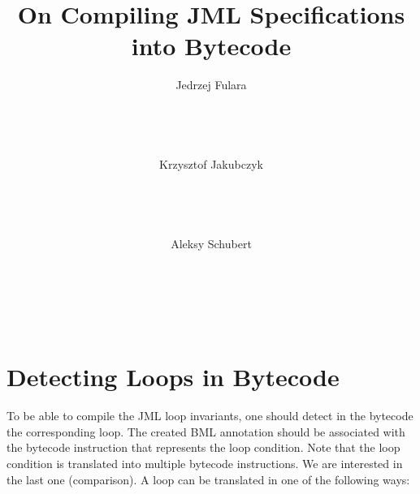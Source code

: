\documentclass{acm_proc_article-sp}
\author{
\alignauthor
Jedrzej Fulara\\
\affaddr{Institute of Informatics}\\
\affaddr{University of Warsaw}\\
\affaddr{ul. Banacha 2}\\
\affaddr{02-097 Warsaw, Poland}\\
\email{fulara@mimuw.edu.pl}
\alignauthor
Krzysztof Jakubczyk\\
\affaddr{Institute of Informatics}\\
\affaddr{University of Warsaw}\\
\affaddr{ul. Banacha 2}\\
\affaddr{02-097 Warsaw, Poland}\\
\email{jakubczyk@mimuw.edu.pl}
\alignauthor
Aleksy Schubert\\
\affaddr{Institute of Informatics}\\
\affaddr{University of Warsaw}\\
\affaddr{ul. Banacha 2}\\
\affaddr{02-097 Warsaw, Poland}\\
\email{alx@mimuw.edu.pl}
}
\title{On Compiling JML Specifications into Bytecode}
\begin{document}
\maketitle



\section{Detecting Loops in Bytecode}\label{loopDetection}
To be able to compile the JML loop invariants, one should detect in the bytecode the corresponding loop. The created BML annotation should be associated with the bytecode instruction that represents the loop condition. Note that the loop condition is translated into multiple bytecode instructions. We are interested in the last one (comparison). A loop can be translated in one of the following ways:
\end{document}
